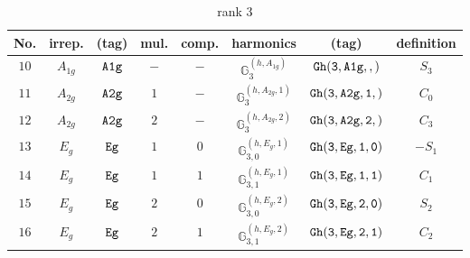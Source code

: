 \documentclass[fleqn,8pt]{jsarticle}
\begin{document}
\begin{table}[ht!]
\begin{center}
\caption{rank 3}
\renewcommand{\arraystretch}{1.3}
\begin{tabular}{cccccccc} \hline \hline
No. & irrep. & (tag) & mul. & comp. & harmonics & (tag) & definition \\ \hline
$ 10 $ & $ A_{1g} $ & $ {\tt A1g} $ & $ - $ & $ - $ & $ \mathbb{G}_{3}^{(h,A_{1g})} $ & $ {\tt Gh(3,A1g,,)} $ & $ S_{3} $ \\
$ 11 $ & $ A_{2g} $ & $ {\tt A2g} $ & $ 1 $ & $ - $ & $ \mathbb{G}_{3}^{(h,A_{2g},1)} $ & $ {\tt Gh(3,A2g,1,)} $ & $ C_{0} $ \\
$ 12 $ & $ A_{2g} $ & $ {\tt A2g} $ & $ 2 $ & $ - $ & $ \mathbb{G}_{3}^{(h,A_{2g},2)} $ & $ {\tt Gh(3,A2g,2,)} $ & $ C_{3} $ \\
$ 13 $ & $ E_{g} $ & $ {\tt Eg} $ & $ 1 $ & $ 0 $ & $ \mathbb{G}_{3,0}^{(h,E_{g},1)} $ & $ {\tt Gh(3,Eg,1,0)} $ & $ - S_{1} $ \\
$ 14 $ & $ E_{g} $ & $ {\tt Eg} $ & $ 1 $ & $ 1 $ & $ \mathbb{G}_{3,1}^{(h,E_{g},1)} $ & $ {\tt Gh(3,Eg,1,1)} $ & $ C_{1} $ \\
$ 15 $ & $ E_{g} $ & $ {\tt Eg} $ & $ 2 $ & $ 0 $ & $ \mathbb{G}_{3,0}^{(h,E_{g},2)} $ & $ {\tt Gh(3,Eg,2,0)} $ & $ S_{2} $ \\
$ 16 $ & $ E_{g} $ & $ {\tt Eg} $ & $ 2 $ & $ 1 $ & $ \mathbb{G}_{3,1}^{(h,E_{g},2)} $ & $ {\tt Gh(3,Eg,2,1)} $ & $ C_{2} $ \\
 \hline \hline
\end{tabular}
\end{center}
\end{table}
\end{document}
